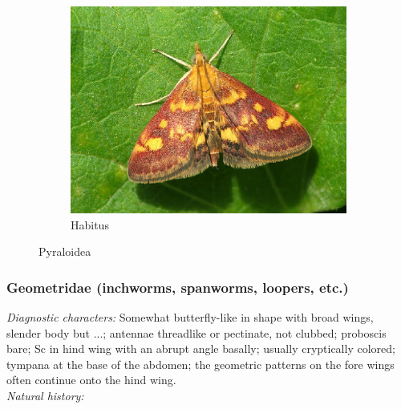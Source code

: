 \documentclass[letterpaper, 11pt]{article}
\begin{document}
\begin{figure}[ht!]
\begin{subfigure}[ht!]{0.48\textwidth}
        \includegraphics[width=\textwidth]{image19}
        \caption{Habitus}
        \label{fig:pyraloid2}
    \end{subfigure}
    \caption{Pyraloidea}\label{fig:pyraloids}
\end{figure}

\subsubsection{Geometridae (inchworms, spanworms, loopers, etc.)}
\noindent{}\textit{Diagnostic characters:} Somewhat butterfly-like in shape with broad wings, slender body but ...; antennae threadlike or pectinate, not clubbed; proboscis bare; Sc in hind wing with an abrupt angle basally; usually cryptically colored; tympana at the base of the abdomen; the geometric patterns on the fore wings often continue onto the hind wing.\\

\noindent{}\textit{Natural history:} 
\end{document}
